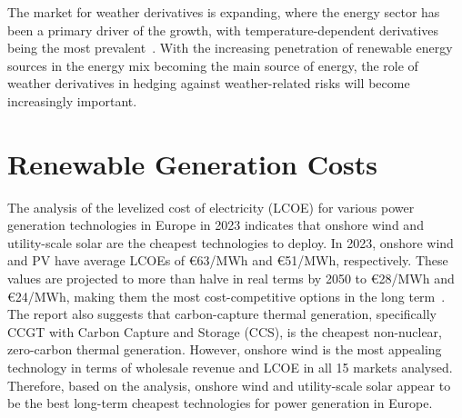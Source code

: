     The market for weather derivatives is expanding, where the energy sector has been a primary driver of the growth,
    with temperature-dependent derivatives being the most prevalent~\cite{ali_pricing_2023}.
    With the increasing penetration of renewable energy sources in the energy mix becoming the main source of energy,
    the role of weather derivatives in hedging against weather-related risks will become increasingly important.

\section{Renewable Generation Costs}
\label{sec:wind_solar_lcoe}

    The analysis of the levelized cost of electricity (LCOE) for various power generation technologies in Europe in 2023
    indicates that onshore wind and utility-scale solar are the cheapest technologies to deploy.
    In 2023, onshore wind and PV have average LCOEs of €63/MWh and €51/MWh, respectively.
    These values are projected to more than halve in real terms by 2050 to €28/MWh and €24/MWh,
    making them the most cost-competitive options in the long term~\cite{abdullah_europe_2023}.
    The report also suggests that carbon-capture thermal generation,
    specifically CCGT with Carbon Capture and Storage (CCS), is the cheapest non-nuclear, zero-carbon thermal generation.
    However, onshore wind is the most appealing technology in terms of wholesale revenue and LCOE in all 15 markets analysed.
    Therefore, based on the analysis, onshore wind and utility-scale solar appear to be the best
    long-term cheapest technologies for power generation in Europe.


%



